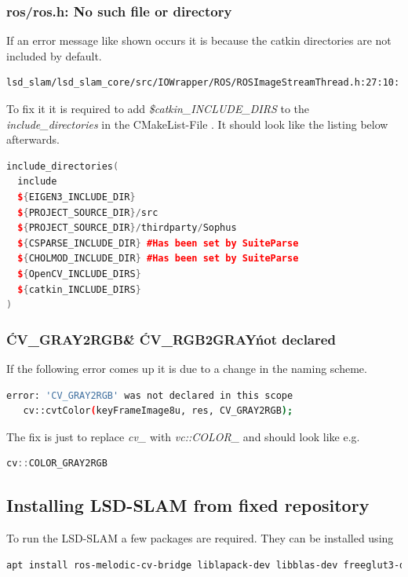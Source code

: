 \subsubsection{ros/ros.h: No such file or directory}
If an error message like shown occurs it is because the catkin directories are not included by default.
\begin{lstlisting}[language=bash]
lsd_slam/lsd_slam_core/src/IOWrapper/ROS/ROSImageStreamThread.h:27:10: fatal error: ros/ros.h: No such file or directory
\end{lstlisting}
To fix it it is required to add \textit{\${catkin\_INCLUDE\_DIRS}} to the \textit{include\_directories} in the CMakeList-File \cite{rosroshnosuchfileordirectory}. It should look like the listing below afterwards.
\begin{lstlisting}[language=C++, caption={Fix for ros/ros.h: No such file or directory}]
include_directories(
  include
  ${EIGEN3_INCLUDE_DIR}
  ${PROJECT_SOURCE_DIR}/src
  ${PROJECT_SOURCE_DIR}/thirdparty/Sophus
  ${CSPARSE_INCLUDE_DIR} #Has been set by SuiteParse
  ${CHOLMOD_INCLUDE_DIR} #Has been set by SuiteParse
  ${OpenCV_INCLUDE_DIRS}
  ${catkin_INCLUDE_DIRS}
)
\end{lstlisting}


\subsubsection{\'CV\_GRAY2RGB\' \& \'CV\_RGB2GRAY\' not declared}
If the following error comes up it is due to a change in the naming scheme.
\begin{lstlisting}[language=bash]
error: 'CV_GRAY2RGB' was not declared in this scope
   cv::cvtColor(keyFrameImage8u, res, CV_GRAY2RGB);
\end{lstlisting}
The fix is just to replace \textit{cv\_} with \textit{vc::COLOR\_} and should look like e.g.  
\begin{lstlisting}[language=C++, caption={Example fix for \'CV\_GRAY2RGB\' \& \'CV\_RGB2GRAY\' not declared}]
cv::COLOR_GRAY2RGB
\end{lstlisting}

\subsection{Installing LSD-SLAM from fixed repository}
To run the LSD-SLAM a few packages are required. They can be installed using\newline
\begin{lstlisting}[language=bash, caption={Installing prerequisites for LSD-SLAM}]
    apt install ros-melodic-cv-bridge liblapack-dev libblas-dev freeglut3-dev libqglviewer-dev-qt4 libsuitesparse-dev libx11-dev
\end{lstlisting}

